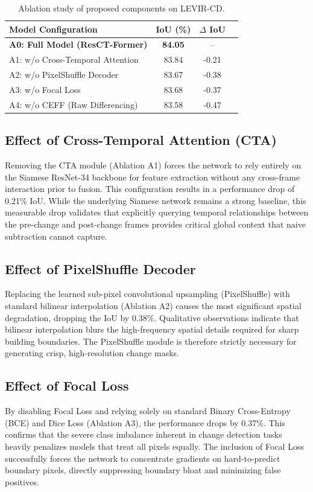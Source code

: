 \documentclass[conference]{IEEEtran}
\begin{document}
\begin{table}[htbp]
\centering
\caption{Ablation study of proposed components on LEVIR-CD.}
\begin{tabular}{|l|c|c|c|}
\hline\hline
\textbf{Model Configuration} & \textbf{IoU (\%)} & \textbf{$\Delta$ IoU} \\
\hline
\textbf{A0: Full Model (ResCT-Former)} & \textbf{84.05} & -- \\
\hline
A1: w/o Cross-Temporal Attention & 83.84 & -0.21 \\
A2: w/o PixelShuffle Decoder & 83.67 & -0.38 \\
A3: w/o Focal Loss & 83.68 & -0.37 \\
A4: w/o CEFF (Raw Differencing) & 83.58 & -0.47 \\
\hline\hline
\end{tabular}
\label{tab:ablation_results}
\end{table}

\subsection{Effect of Cross-Temporal Attention (CTA)}
Removing the CTA module (Ablation A1) forces the network to rely entirely on the Siamese ResNet-34 backbone for feature extraction without any cross-frame interaction prior to fusion. This configuration results in a performance drop of 0.21\% IoU. While the underlying Siamese network remains a strong baseline, this measurable drop validates that explicitly querying temporal relationships between the pre-change and post-change frames provides critical global context that naive subtraction cannot capture.

\subsection{Effect of PixelShuffle Decoder}
Replacing the learned sub-pixel convolutional upsampling (PixelShuffle) with standard bilinear interpolation (Ablation A2) causes the most significant spatial degradation, dropping the IoU by 0.38\%. Qualitative observations indicate that bilinear interpolation blurs the high-frequency spatial details required for sharp building boundaries. The PixelShuffle module is therefore strictly necessary for generating crisp, high-resolution change masks.

\subsection{Effect of Focal Loss}
By disabling Focal Loss and relying solely on standard Binary Cross-Entropy (BCE) and Dice Loss (Ablation A3), the performance drops by 0.37\%. This confirms that the severe class imbalance inherent in change detection tasks heavily penalizes models that treat all pixels equally. The inclusion of Focal Loss successfully forces the network to concentrate gradients on hard-to-predict boundary pixels, directly suppressing boundary bloat and minimizing false positives.
\end{document}
